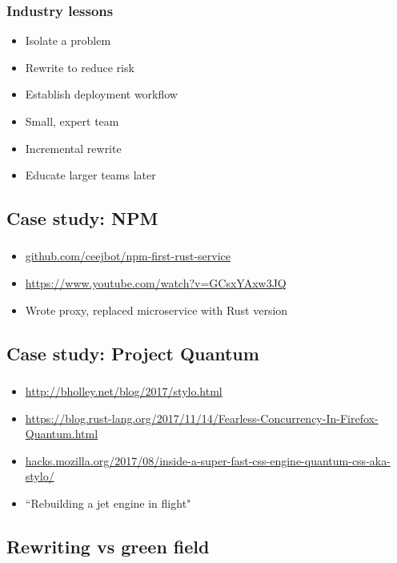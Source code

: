 \documentclass{beamer}
\begin{document}
\begin{frame}[fragile]
\frametitle{Industry lessons}
\begin{itemize}[<+(1)->]
\item Isolate a problem
\item Rewrite to reduce risk
\item Establish deployment workflow
\item Small, expert team
\item Incremental rewrite
\item Educate larger teams later
\end{itemize}
\end{frame}

\subsection{Case study: NPM}

\begin{frame}[fragile]
\frametitle{\insertsubsectionhead}
\begin{itemize}[<+(1)->]
\item \url{github.com/ceejbot/npm-first-rust-service}
\item \url{https://www.youtube.com/watch?v=GCsxYAxw3JQ}
\item Wrote proxy, replaced microservice with Rust version
\end{itemize}
\end{frame}

\subsection{Case study: Project Quantum}

\begin{frame}[fragile]
\frametitle{\insertsubsectionhead}
\begin{itemize}[<+(1)->]
\item \url{http://bholley.net/blog/2017/stylo.html}
\item \url{https://blog.rust-lang.org/2017/11/14/Fearless-Concurrency-In-Firefox-Quantum.html}
\item \url{hacks.mozilla.org/2017/08/inside-a-super-fast-css-engine-quantum-css-aka-stylo/}
\item ``Rebuilding a jet engine in flight"
\end{itemize}
\end{frame}

\subsection{Rewriting vs green field}
\end{document}
